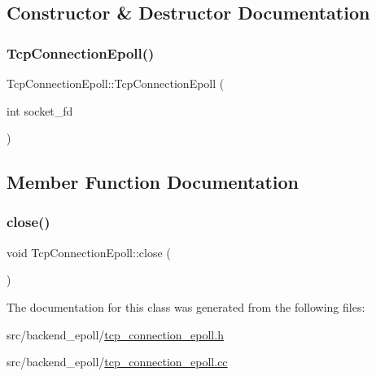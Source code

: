 \subsection{Constructor \& Destructor Documentation}
\mbox{\label{classTcpConnectionEpoll_a8a0d4fe2dc75d4e6f29f0221aeb16516}} 
\subsubsection{\texorpdfstring{Tcp\+Connection\+Epoll()}{TcpConnectionEpoll()}}
{\footnotesize\ttfamily Tcp\+Connection\+Epoll\+::\+Tcp\+Connection\+Epoll (\begin{DoxyParamCaption}\item[{int}]{socket\+\_\+fd }\end{DoxyParamCaption})}



\subsection{Member Function Documentation}
\mbox{\label{classTcpConnectionEpoll_a6109a1ddd496e5307888d2c70fffc2c6}} 
\subsubsection{\texorpdfstring{close()}{close()}}
{\footnotesize\ttfamily void Tcp\+Connection\+Epoll\+::close (\begin{DoxyParamCaption}{ }\end{DoxyParamCaption})\hspace{0.3cm}{\ttfamily [override]}}



The documentation for this class was generated from the following files\+:\begin{DoxyCompactItemize}
\item 
src/backend\+\_\+epoll/\hyperlink{tcp__connection__epoll_8h}{tcp\+\_\+connection\+\_\+epoll.\+h}\item 
src/backend\+\_\+epoll/\hyperlink{tcp__connection__epoll_8cc}{tcp\+\_\+connection\+\_\+epoll.\+cc}\end{DoxyCompactItemize}
